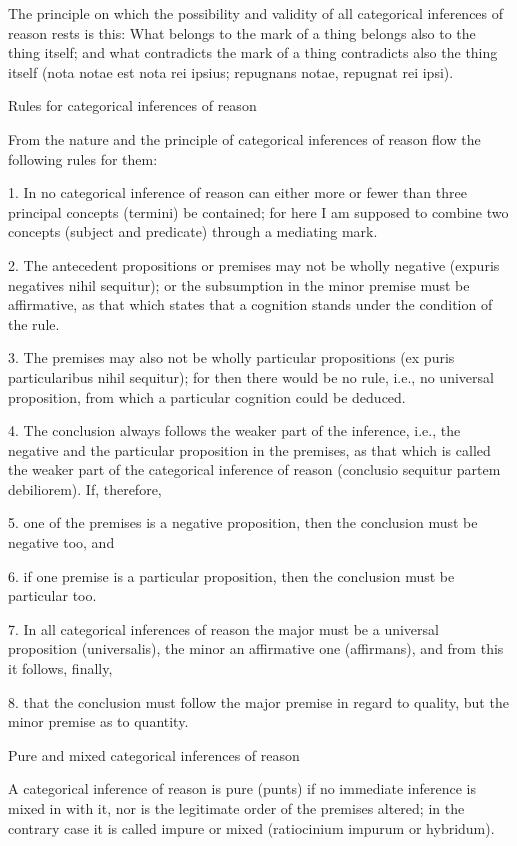 The principle on which the possibility and validity of
all categorical inferences of reason rests is this:
What belongs to the mark of a thing
belongs also to the thing itself;
and what contradicts the mark of a thing
contradicts also the thing itself
(nota notae est nota rei ipsius;
repugnans notae, repugnat rei ipsi).

Rules for categorical inferences of reason

From the nature and the principle of
categorical inferences of reason
flow the following rules for them:

1.  In no categorical inference of reason can
    either more or fewer than three
    principal concepts (termini) be contained;
    for here I am supposed to combine
    two concepts (subject and predicate)
    through a mediating mark.

2.  The antecedent propositions or premises
    may not be wholly negative
    (expuris negatives nihil sequitur);
    or the subsumption in the minor premise must be affirmative,
    as that which states that a cognition
    stands under the condition of the rule.

3.  The premises may also not be wholly particular propositions
    (ex puris particularibus nihil sequitur);
    for then there would be no rule, i.e., no universal proposition,
    from which a particular cognition could be deduced.

4.  The conclusion always follows the weaker part of the inference, i.e.,
    the negative and the particular proposition in the premises,
    as that which is called the weaker part of
    the categorical inference of reason
    (conclusio sequitur partem debiliorem).
    If, therefore,

5.  one of the premises is a negative proposition,
    then the conclusion must be negative too, and

6.  if one premise is a particular proposition,
    then the conclusion must be particular too.

7.  In all categorical inferences of reason
    the major must be a universal proposition (universalis),
    the minor an affirmative one (affirmans),
    and from this it follows, finally,

8.  that the conclusion must follow
    the major premise in regard to quality,
    but the minor premise as to quantity.

Pure and mixed categorical inferences of reason

A categorical inference of reason is pure (punts)
if no immediate inference is mixed in with it,
nor is the legitimate order of the premises altered;
in the contrary case it is called impure or mixed
(ratiocinium impurum or hybridum).

